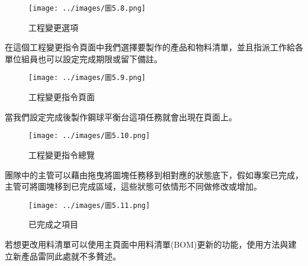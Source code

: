 \begin{figure}[h!]
\centering
\texttt{[image: ../images/圖5.8.png]}
\caption{工程變更選項}
\end{figure}

在這個工程變更指令頁面中我們選擇要製作的產品和物料清單，並且指派工作給各單位組員也可以設定完成期限或留下備註。

\begin{figure}[h!]
\centering
\texttt{[image: ../images/圖5.9.png]}
\caption{工程變更指令頁面}
\end{figure}

當我們設定完成後製作鋼球平衡台這項任務就會出現在頁面上。

\begin{figure}[h!]
\centering
\texttt{[image: ../images/圖5.10.png]}
\caption{工程變更指令總覽}
\end{figure}

團隊中的主管可以藉由拖曳將圖塊任務移到相對應的狀態底下，假如專案已完成，主管可將圖塊移到已完成區域，這些狀態可依情形不同做修改或增加。

\begin{figure}[h!]
\centering
\texttt{[image: ../images/圖5.11.png]}
\caption{已完成之項目}
\end{figure}

若想更改用料清單可以使用主頁面中用料清單(BOM)更新的功能，使用方法與建立新產品雷同此處就不多贅述。

\newpage